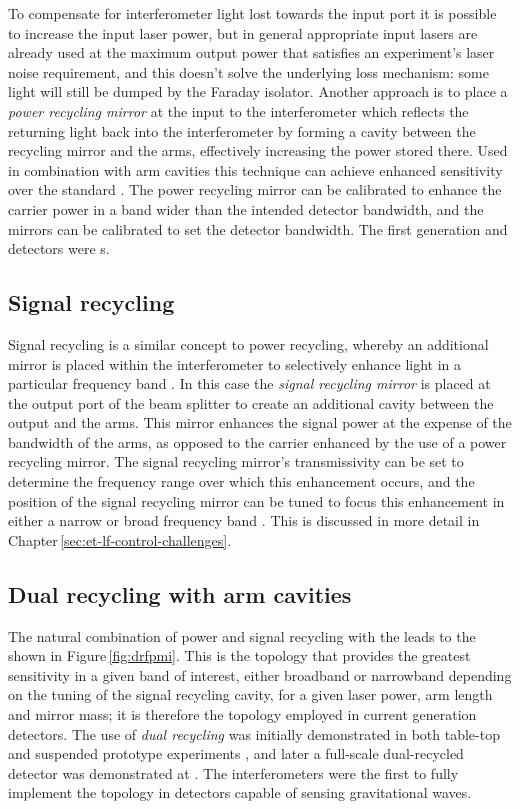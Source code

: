 To compensate for interferometer light lost towards the input port it is possible to increase the input laser power, but in general appropriate input lasers are already used at the maximum output power that satisfies an experiment's laser noise requirement, and this doesn't solve the underlying loss mechanism: some light will still be dumped by the Faraday isolator. Another approach is to place a \emph{power recycling mirror} at the input to the interferometer which reflects the returning light back into the interferometer by forming a cavity between the recycling mirror and the arms, effectively increasing the power stored there. Used in combination with \FP{} arm cavities this technique can achieve enhanced sensitivity over the standard \MI{}. The power recycling mirror can be calibrated to enhance the carrier power in a band wider than the intended detector bandwidth, and the \FP{} mirrors can be calibrated to set the detector bandwidth. The first generation \ILIGO{} and \IVIRGO{} detectors were \PRFPMI{}s.

\subsection{\label{sec:signal-recycling}Signal recycling}
Signal recycling is a similar concept to power recycling, whereby an additional mirror is placed within the interferometer to selectively enhance light in a particular frequency band \cite{Meers1988}. In this case the \emph{signal recycling mirror} is placed at the output port of the beam splitter to create an additional cavity between the output and the arms. This mirror enhances the signal power at the expense of the bandwidth of the arms, as opposed to the carrier enhanced by the use of a power recycling mirror. The signal recycling mirror's transmissivity can be set to determine the frequency range over which this enhancement occurs, and the position of the signal recycling mirror can be tuned to focus this enhancement in either a narrow or broad frequency band \cite{Buonanno2001}. This is discussed in more detail in Chapter\,\ref{sec:et-lf-control-challenges}.

\subsection{Dual recycling with \FP{} arm cavities}
The natural combination of power and signal recycling with the \FPMI{} leads to the \emph{\DRFPMI{}} shown in Figure\,\ref{fig:drfpmi}. This is the topology that provides the greatest sensitivity in a given band of interest, either broadband or narrowband depending on the tuning of the signal recycling cavity, for a given laser power, arm length and mirror mass; it is therefore the topology employed in current generation detectors. The use of \emph{dual recycling} was initially demonstrated in both table-top and suspended prototype experiments \cite{Strain1991, Heinzel1998, Freise2000}, and later a full-scale dual-recycled \MI{} detector was demonstrated at \GEO{} \cite{Heinzel2002, Grote2004}. The \ALIGO{} interferometers were the first to fully implement the \DRFPMI{} topology in detectors capable of sensing gravitational waves.

